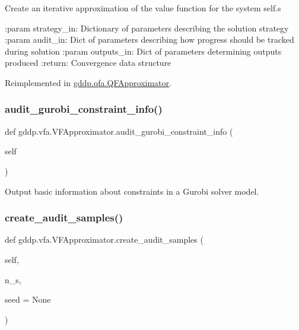 \begin{DoxyVerb}Create an iterative approximation of the value function for the system self.s

:param strategy_in: Dictionary of parameters describing the solution strategy
:param audit_in: Dict of parameters describing how progress should be tracked during solution
:param outputs_in: Dict of parameters determining outputs produced
:return: Convergence data structure
\end{DoxyVerb}
 

Reimplemented in \mbox{\hyperlink{classgddp_1_1qfa_1_1_q_f_approximator_aab82083cc8e6b64cc0bedc47532f865f}{gddp.\+qfa.\+Q\+F\+Approximator}}.

\mbox{\label{classgddp_1_1vfa_1_1_v_f_approximator_ad87136687e35dfb1127c56a10f1656c8}} 
\subsubsection{\texorpdfstring{audit\_gurobi\_constraint\_info()}{audit\_gurobi\_constraint\_info()}}
{\footnotesize\ttfamily def gddp.\+vfa.\+V\+F\+Approximator.\+audit\+\_\+gurobi\+\_\+constraint\+\_\+info (\begin{DoxyParamCaption}\item[{}]{self }\end{DoxyParamCaption})}

\begin{DoxyVerb}Output basic information about constraints in a Gurobi solver model.\end{DoxyVerb}
 \mbox{\label{classgddp_1_1vfa_1_1_v_f_approximator_a9083527d48dc57388dada7e7e39d23b3}} 
\subsubsection{\texorpdfstring{create\_audit\_samples()}{create\_audit\_samples()}}
{\footnotesize\ttfamily def gddp.\+vfa.\+V\+F\+Approximator.\+create\+\_\+audit\+\_\+samples (\begin{DoxyParamCaption}\item[{}]{self,  }\item[{}]{n\+\_\+s,  }\item[{}]{seed = {\ttfamily None} }\end{DoxyParamCaption})}

